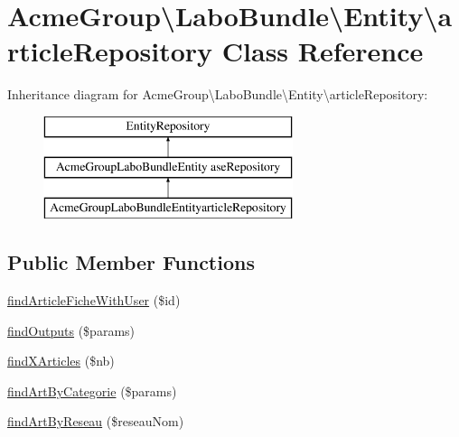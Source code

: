 \hypertarget{class_acme_group_1_1_labo_bundle_1_1_entity_1_1article_repository}{\section{Acme\+Group\textbackslash{}Labo\+Bundle\textbackslash{}Entity\textbackslash{}article\+Repository Class Reference}
\label{class_acme_group_1_1_labo_bundle_1_1_entity_1_1article_repository}
}
Inheritance diagram for Acme\+Group\textbackslash{}Labo\+Bundle\textbackslash{}Entity\textbackslash{}article\+Repository\+:\begin{figure}[H]
\begin{center}
\leavevmode
\includegraphics[height=3.000000cm]{class_acme_group_1_1_labo_bundle_1_1_entity_1_1article_repository}
\end{center}
\end{figure}
\subsection*{Public Member Functions}
\begin{DoxyCompactItemize}
\item 
\hyperlink{class_acme_group_1_1_labo_bundle_1_1_entity_1_1article_repository_a69ec7f0a399b2abdeb7689d9a7f2e7e6}{find\+Article\+Fiche\+With\+User} (\$id)
\item 
\hyperlink{class_acme_group_1_1_labo_bundle_1_1_entity_1_1article_repository_a152c973382253ca7b651d977ece9334e}{find\+Outputs} (\$params)
\item 
\hyperlink{class_acme_group_1_1_labo_bundle_1_1_entity_1_1article_repository_ac80c8c4259598ec8f9ebefbc4853766d}{find\+X\+Articles} (\$nb)
\item 
\hyperlink{class_acme_group_1_1_labo_bundle_1_1_entity_1_1article_repository_a3ddb45a52a4d5692336ac418a367932b}{find\+Art\+By\+Categorie} (\$params)
\item 
\hyperlink{class_acme_group_1_1_labo_bundle_1_1_entity_1_1article_repository_a75d4666f7ea4527769ee9d0486ad71a3}{find\+Art\+By\+Reseau} (\$reseau\+Nom)
\end{DoxyCompactItemize}
